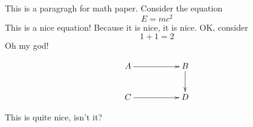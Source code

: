 \documentclass[4paper, reqno, 10pt]{amsart} %
\theoremstyle{definition}
\numberwithin{equation}{section}
\begin{document}

This is a paragragh for math paper. Consider the equation
$$
E=mc^2
$$
This is a nice equation! Because it is nice, it is nice. OK, consider
$$
1+1=2
$$
Oh my god!

$$
\xymatrix{
A\ar[rr]&&B\ar[d]\\
C\ar[rr]&&D\\
}
$$

This is quite nice, isn't it?
\end{document}
